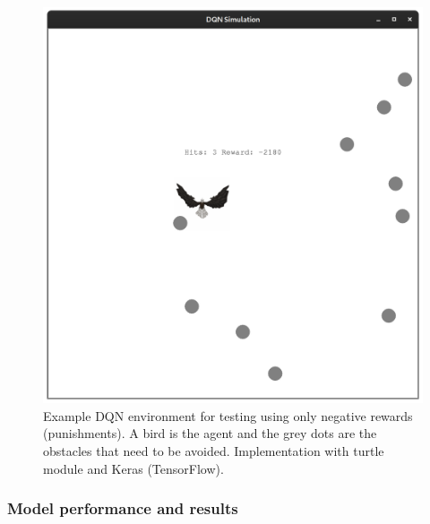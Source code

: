 \documentclass[b5paper]{book}
\begin{document}

\begin{figure}[!ht]
  \centering
  \includegraphics[scale=0.2]{figures/dqn_bird.png} 
  \caption{Example DQN environment for testing using only negative rewards (punishments). A bird is the agent and the grey dots are the obstacles that need to be avoided. Implementation with turtle module and Keras (TensorFlow).}
  \label{fig:bird}
\end{figure}


\subsubsection{Model performance and results}
\end{document}
